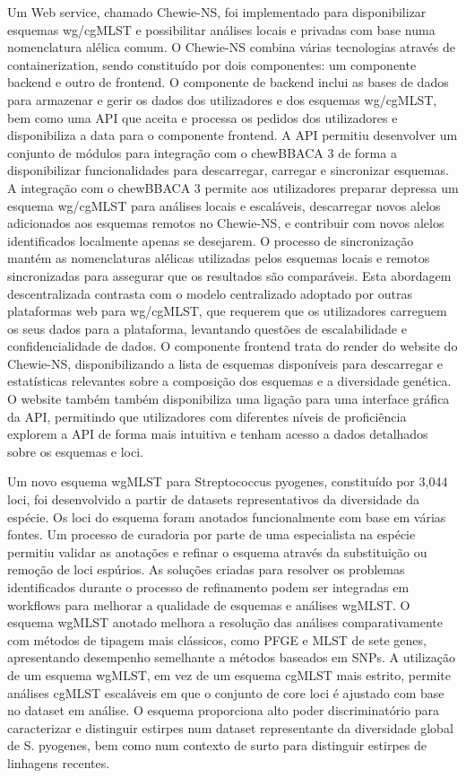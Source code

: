 Um Web service, chamado Chewie-NS, foi implementado para disponibilizar esquemas wg/cgMLST e possibilitar análises locais e privadas com base numa nomenclatura alélica comum. O Chewie-NS combina várias tecnologias através de containerization, sendo constituído por dois componentes: um componente backend e outro de frontend. O componente de backend inclui as bases de dados para armazenar e gerir os dados dos utilizadores e dos esquemas wg/cgMLST, bem como uma API que aceita e processa os pedidos dos utilizadores e disponibiliza a data para o componente frontend. A API permitiu desenvolver um conjunto de módulos para integração com o chewBBACA 3 de forma a disponibilizar funcionalidades para descarregar, carregar e sincronizar esquemas. A integração com o chewBBACA 3 permite aos utilizadores preparar depressa um esquema wg/cgMLST para análises locais e escaláveis, descarregar novos alelos adicionados aos esquemas remotos no Chewie-NS, e contribuir com novos alelos identificados localmente apenas se desejarem. O processo de sincronização mantém as nomenclaturas alélicas utilizadas pelos esquemas locais e remotos sincronizadas para assegurar que os resultados são comparáveis. Esta abordagem descentralizada contrasta com o modelo centralizado adoptado por outras plataformas web para wg/cgMLST, que requerem que os utilizadores carreguem os seus dados para a plataforma, levantando questões de escalabilidade e confidencialidade de dados. O componente frontend trata do render do website do Chewie-NS, disponibilizando a lista de esquemas disponíveis para descarregar e estatísticas relevantes sobre a composição dos esquemas e a diversidade genética. O website também também disponibiliza uma ligação para uma interface gráfica da API, permitindo que utilizadores com diferentes níveis de proficiência explorem a API de forma mais intuitiva e tenham acesso a dados detalhados sobre os esquemas e loci.

Um novo esquema wgMLST para Streptococcus pyogenes, constituído por 3,044 loci, foi desenvolvido a partir de datasets representativos da diversidade da espécie. Os loci do esquema foram anotados funcionalmente com base em várias fontes. Um processo de curadoria por parte de uma especialista na espécie permitiu validar as anotações e refinar o esquema através da substituição ou remoção de loci espúrios. As soluções criadas para resolver os problemas identificados durante o processo de refinamento podem ser integradas em workflows para melhorar a qualidade de esquemas e análises wgMLST. O esquema wgMLST anotado melhora a resolução das análises comparativamente com métodos de tipagem mais clássicos, como PFGE e MLST de sete genes, apresentando desempenho semelhante a métodos baseados em SNPs. A utilização de um esquema wgMLST, em vez de um esquema cgMLST mais estrito, permite análises cgMLST escaláveis em que o conjunto de core loci é ajustado com base no dataset em análise. O esquema proporciona alto poder discriminatório para caracterizar e distinguir estirpes num dataset representante da diversidade global de S. pyogenes, bem como num contexto de surto para distinguir estirpes de linhagens recentes.

